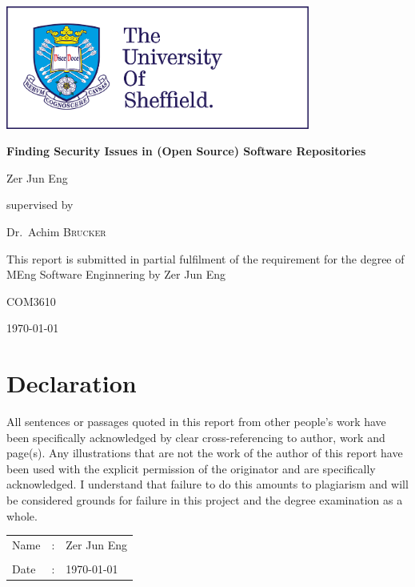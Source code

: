 \documentclass[12pt, a4paper]{report}
\begin{document}
\begin{titlepage}
	\centering
	\includegraphics[width=10cm]{tuos_logo}\par\vspace{1cm}
	\vspace{1cm}

	{\huge\bfseries Finding Security Issues in (Open Source) Software Repositories\par}
	\vspace{1cm}

	{\Large Zer Jun Eng\par}
	\vspace{1cm}

	supervised by\par Dr.~Achim \textsc{Brucker}
	\vfill

	{This report is submitted in partial fulfilment of the requirement for the degree of MEng Software
		Enginnering by Zer Jun Eng}
	\vfill

	{\large COM3610}
	\vfill

	{\large \today}
\end{titlepage}


\chapter*{Declaration}
All sentences or passages quoted in this report from other people's work have been specifically
acknowledged by clear cross-referencing to author, work and page(s). Any illustrations that are not
the work of the author of this report have been used with the explicit permission of the originator
and are specifically acknowledged. I understand that failure to do this amounts to plagiarism and
will be considered grounds for failure in this project and the degree examination as a whole.
\vspace{2cm}

\noindent \begin{tabular}{llp{4.5cm}}
	Name & : & Zer Jun Eng \\ \cline{3-3}
	\\ [-0.5em]
	Date & : & \today      \\ \cline{3-3}
\end{tabular}
\end{document}

